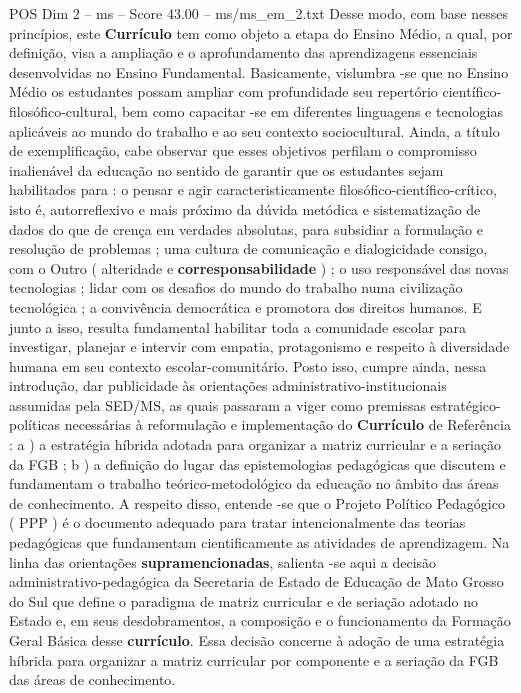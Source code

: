 \begin{textsample}{POS Dim 2 – ms – Score 43.00 – ms/ms\_em\_2.txt}
Desse modo, com base nesses princípios, este \textbf{Currículo} tem como objeto a etapa do Ensino Médio, a qual, por definição, visa a ampliação e o aprofundamento das aprendizagens essenciais desenvolvidas no Ensino Fundamental.
Basicamente, vislumbra -se que no Ensino Médio os estudantes possam ampliar com profundidade seu repertório científico-filosófico-cultural, bem como capacitar -se em diferentes linguagens e tecnologias aplicáveis ao mundo do trabalho e ao seu contexto sociocultural.
Ainda, a título de exemplificação, cabe observar que esses objetivos perfilam o compromisso inalienável da educação no sentido de garantir que os estudantes sejam habilitados para : o pensar e agir caracteristicamente filosófico-científico-crítico, isto é, autorreflexivo e mais próximo da dúvida metódica e sistematização de dados do que de crença em verdades absolutas, para subsidiar a formulação e resolução de problemas ; uma cultura de comunicação e dialogicidade consigo, com o Outro ( alteridade e \textbf{corresponsabilidade} ) ; o uso responsável das novas tecnologias ; lidar com os desafios do mundo do trabalho numa civilização tecnológica ; a convivência democrática e promotora dos direitos humanos.
E junto a isso, resulta fundamental habilitar toda a comunidade escolar para investigar, planejar e intervir com empatia, protagonismo e respeito à diversidade humana em seu contexto escolar-comunitário.
Posto isso, cumpre ainda, nessa introdução, dar publicidade às orientações administrativo-institucionais assumidas pela SED/MS, as quais passaram a viger como premissas estratégico-políticas necessárias à reformulação e implementação do \textbf{Currículo} de Referência : a ) a estratégia híbrida adotada para organizar a matriz curricular e a seriação da FGB ; b ) a definição do lugar das epistemologias pedagógicas que discutem e fundamentam o trabalho teórico-metodológico da educação no âmbito das áreas de conhecimento.
A respeito disso, entende -se que o Projeto Político Pedagógico ( PPP ) é o documento adequado para tratar intencionalmente das teorias pedagógicas que fundamentam cientificamente as atividades de aprendizagem.
Na linha das orientações \textbf{supramencionadas}, salienta -se aqui a decisão administrativo-pedagógica da Secretaria de Estado de Educação de Mato Grosso do Sul que define o paradigma de matriz curricular e de seriação adotado no Estado e, em seus desdobramentos, a composição e o funcionamento da Formação Geral Básica desse \textbf{currículo}.
Essa decisão concerne à adoção de uma estratégia híbrida para organizar a matriz curricular por componente e a seriação da FGB das áreas de conhecimento.

\end{textsample}
